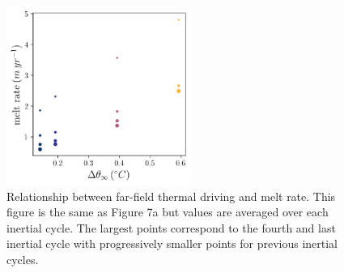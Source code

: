 \documentclass[tc, manuscript]{copernicus}
\begin{document}
\begin{figure}[t]
\includegraphics[width=6cm]{figS7.pdf}
\caption{Relationship between far-field thermal driving and melt rate. This figure is the same as Figure 7a but values are averaged over each inertial cycle. The largest points correspond to the fourth and last inertial cycle with progressively smaller points for previous inertial cycles. }
\label{fig:melt_sensitivity_cycles}
\end{figure}
\end{document}
